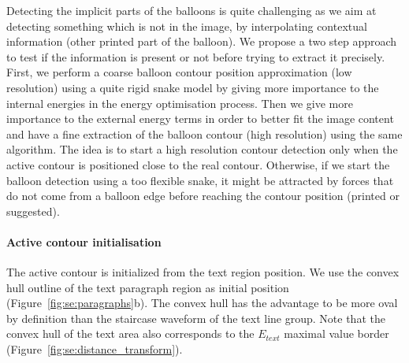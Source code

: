 Detecting the implicit parts of the balloons is quite challenging as we aim at detecting something which is not in the image, by interpolating contextual information (other printed part of the balloon).
We propose a two step approach to test if the information is present or not before trying to extract it precisely.
First, we perform a coarse balloon contour position approximation (low resolution) using a quite rigid snake model by giving more importance to the internal energies in the energy optimisation process.
Then we give more importance to the external energy terms in order to better fit the image content and have a fine extraction of the balloon contour (high resolution) using the same algorithm.
The idea is to start a high resolution contour detection only when the active contour is positioned close to the real contour.
Otherwise, if we start the balloon detection using a too flexible snake, it might be attracted by forces that do not come from a balloon edge before reaching the contour position (printed or suggested).


\paragraph{Active contour initialisation}
\label{sec:se:cont_init}

The active contour is initialized from the text region position.
We use the convex hull outline of the text paragraph region as initial position (Figure~\ref{fig:se:paragraphs}b).
The convex hull has the advantage to be more oval by definition than the staircase waveform of the text line group.
Note that the convex hull of the text area also corresponds to the $E_{text}$ maximal value border (Figure~\ref{fig:se:distance_transform}).

